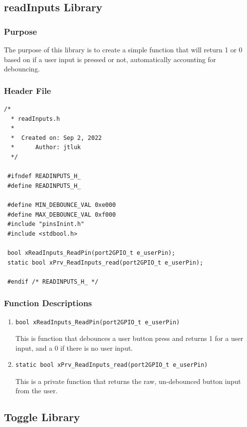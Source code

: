 \documentclass[11pt,a4paper]{article}
\begin{document}
\subsection{readInputs Library}
\subsubsection{Purpose}
The purpose of this library is to create a simple function that will return 1 or 0 based on if a user
input is pressed or not, automatically accounting for debouncing.

\subsubsection{Header File}
\begin{lstlisting}[style=CStyle]
  /*
  * readInputs.h
  *
  *  Created on: Sep 2, 2022
  *      Author: jtluk
  */
 
 #ifndef READINPUTS_H_
 #define READINPUTS_H_
 
 #define MIN_DEBOUNCE_VAL 0xe000
 #define MAX_DEBOUNCE_VAL 0xf000
 #include "pinsInint.h"
 #include <stdbool.h>
 
 bool xReadInputs_ReadPin(port2GPIO_t e_userPin);
 static bool xPrv_ReadInputs_read(port2GPIO_t e_userPin);
 
 #endif /* READINPUTS_H_ */
\end{lstlisting}

\subsubsection{Function Descriptions}
\begin{enumerate}
  \item \begin{lstlisting}[style=functionStyle]
    bool xReadInputs_ReadPin(port2GPIO_t e_userPin)
  \end{lstlisting}
  This is function that debounces a user button press and returns 1 for a user input,
  and a 0 if there is no user input.

  \item \begin{lstlisting}[style=functionStyle]
    static bool xPrv_ReadInputs_read(port2GPIO_t e_userPin)
  \end{lstlisting}
  This is a private function that returns the raw, un-debounced button input from the user.
\end{enumerate}

\subsection{Toggle Library}
\end{document}
